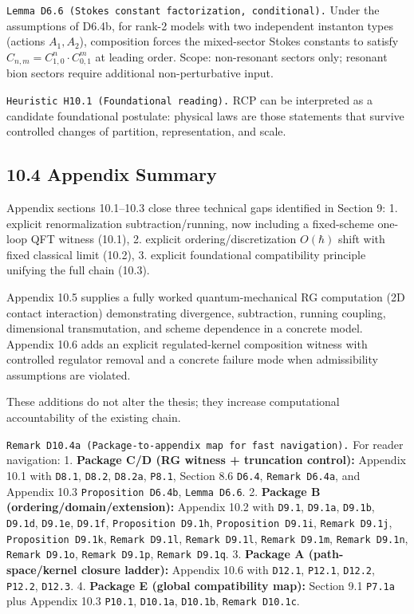 \documentclass[
]{article}
\begin{document}
\texttt{Lemma\ D6.6\ (Stokes\ constant\ factorization,\ conditional).}
Under the assumptions of D6.4b, for rank-2 models with two independent
instanton types (actions \(A_1, A_2\)), composition forces the
mixed-sector Stokes constants to satisfy
\(C_{n,m} = C_{1,0}^n \cdot C_{0,1}^m\) at leading order. Scope:
non-resonant sectors only; resonant bion sectors require additional
non-perturbative input.

\texttt{Heuristic\ H10.1\ (Foundational\ reading).} RCP can be
interpreted as a candidate foundational postulate: physical laws are
those statements that survive controlled changes of partition,
representation, and scale.

\hypertarget{appendix-summary}{%
\subsection{10.4 Appendix Summary}\label{appendix-summary}}

Appendix sections 10.1--10.3 close three technical gaps identified in
Section 9: 1. explicit renormalization subtraction/running, now
including a fixed-scheme one-loop QFT witness (10.1), 2. explicit
ordering/discretization \(O(\hbar)\) shift with fixed classical limit
(10.2), 3. explicit foundational compatibility principle unifying the
full chain (10.3).

Appendix 10.5 supplies a fully worked quantum-mechanical RG computation
(2D contact interaction) demonstrating divergence, subtraction, running
coupling, dimensional transmutation, and scheme dependence in a concrete
model. Appendix 10.6 adds an explicit regulated-kernel composition
witness with controlled regulator removal and a concrete failure mode
when admissibility assumptions are violated.

These additions do not alter the thesis; they increase computational
accountability of the existing chain.

\texttt{Remark\ D10.4a\ (Package-to-appendix\ map\ for\ fast\ navigation).}
For reader navigation: 1. \textbf{Package C/D (RG witness + truncation
control):} Appendix 10.1 with \texttt{D8.1}, \texttt{D8.2},
\texttt{D8.2a}, \texttt{P8.1}, Section 8.6 \texttt{D6.4},
\texttt{Remark\ D6.4a}, and Appendix 10.3 \texttt{Proposition\ D6.4b},
\texttt{Lemma\ D6.6}. 2. \textbf{Package B (ordering/domain/extension):}
Appendix 10.2 with \texttt{D9.1}, \texttt{D9.1a}, \texttt{D9.1b},
\texttt{D9.1d}, \texttt{D9.1e}, \texttt{D9.1f},
\texttt{Proposition\ D9.1h}, \texttt{Proposition\ D9.1i},
\texttt{Remark\ D9.1j}, \texttt{Proposition\ D9.1k},
\texttt{Remark\ D9.1l}, \texttt{Remark\ D9.1l\textquotesingle{}},
\texttt{Remark\ D9.1m}, \texttt{Remark\ D9.1n}, \texttt{Remark\ D9.1o},
\texttt{Remark\ D9.1p}, \texttt{Remark\ D9.1q}. 3. \textbf{Package A
(path-space/kernel closure ladder):} Appendix 10.6 with \texttt{D12.1},
\texttt{P12.1}, \texttt{D12.2}, \texttt{P12.2}, \texttt{D12.3}. 4.
\textbf{Package E (global compatibility map):} Section 9.1
\texttt{P7.1a} plus Appendix 10.3 \texttt{P10.1}, \texttt{D10.1a},
\texttt{D10.1b}, \texttt{Remark\ D10.1c}.
\end{document}
